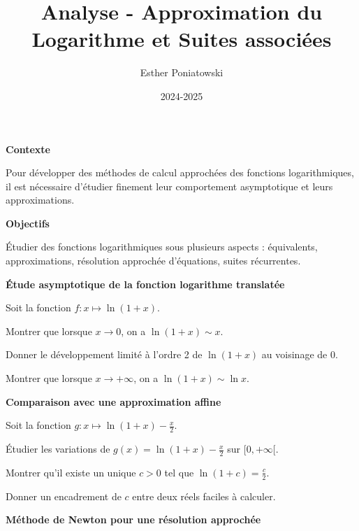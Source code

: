 \documentclass[10pt,a4paper]{article}
\title{Analyse - Approximation du Logarithme et Suites associées}
\author{Esther Poniatowski}
\date{2024-2025}
\begin{document}
\textbf{Contexte}

Pour développer des méthodes de calcul approchées des fonctions logarithmiques, il est nécessaire
d'étudier finement leur comportement asymptotique et leurs approximations.

\bigskip
\textbf{Objectifs}

Étudier des fonctions logarithmiques sous plusieurs aspects : équivalents, approximations,
résolution approchée d'équations, suites récurrentes.

\vspace{0.5cm}
\textbf{Étude asymptotique de la fonction logarithme translatée}

Soit la fonction \( f : x \mapsto \ln(1+x) \).

\q Montrer que lorsque \( x \to 0 \), on a \( \ln(1+x) \sim x \).

\q Donner le développement limité à l'ordre 2 de \( \ln(1+x) \) au voisinage de 0.

\q Montrer que lorsque \( x \to +\infty \), on a \( \ln(1+x) \sim \ln x \).

\vspace{0.5cm}

\textbf{Comparaison avec une approximation affine}

Soit la fonction \( g : x \mapsto \ln(1+x) - \frac{x}{2} \).

\q Étudier les variations de \( g(x) = \ln(1+x) - \frac{x}{2} \) sur \( [0, +\infty[ \).

\q Montrer qu'il existe un unique \( c > 0 \) tel que \( \ln(1+c) = \frac{c}{2} \).

\q Donner un encadrement de \( c \) entre deux réels faciles à calculer.

\vspace{0.5cm}
\textbf{Méthode de Newton pour une résolution approchée}
\end{document}
